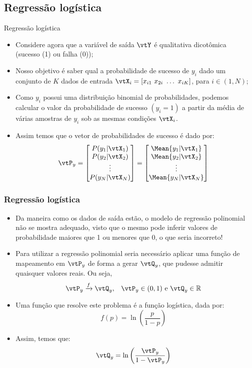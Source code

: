 \subsection{Regressão logística}
\begin{frame}{Regressão logística}
	\begin{itemize}
		\item Considere agora que a variável de saída $\vtY$ é qualitativa dicotômica (sucesso (1) ou falha (0));
		\item Nosso objetivo é saber qual a probabilidade de sucesso de $y_i$ dado um conjunto de $K$ dados de entrada $\vtX_i = [x_{i1} \,\, x_{2i} \,\, \dots \,\, x_{iK}]$, para $i \in (1, N)$;
		\item Como $y_i$ possui uma distribuição binomial de probabilidades, podemos calcular o valor da probabilidade de sucesso $(y_i = 1)$ a partir da média de várias amostras de $y_i$ sob as mesmas condições $\vtX_i$.
		\item Assim temos que o vetor de probabilidades de sucesso é dado por:
		\[
			\vtP_y = \begin{bmatrix}
				P(y_1 | \vtX_1) \\
				P(y_2 | \vtX_2) \\
				\vdots \\
				P(y_N | \vtX_N)
			\end{bmatrix} = 
			\begin{bmatrix}
				\Mean{y_1 | \vtX_1} \\
				\Mean{y_2 | \vtX_2} \\
				\vdots \\
				\Mean{y_N | \vtX_N}
			\end{bmatrix}
		\]
	\end{itemize}
\end{frame}

\begin{frame}
	\frametitle{Regressão logística}
	\begin{itemize}
		\item Da maneira como os dados de saída estão, o modelo de regressão polinomial não se mostra adequado, visto que o mesmo pode inferir valores de probabilidade maiores que 1 ou menores que 0, o que seria incorreto!
		\item Para utilizar a regressão polinomial seria necessário aplicar uma função de mapeamento em $\vtP_y$ de forma a gerar $\vtQ_y$, que pudesse admitir quaisquer valores reais. Ou seja,
		\begin{equation}
			\vtP_y \xrightarrow{f} \vtQ_y, \,\,\,\,\, \vtP_y \in (0,1) \textrm{ e } \vtQ_y \in \mathbb{R}
		\end{equation}
		\item Uma função que resolve este problema é a função logística, dada por:
		\begin{equation}
			f(p) = \ln\left(\dfrac{p}{1-p}\right)
		\end{equation}
		\item Assim, temos que:
		\begin{equation}
			\vtQ_y = \ln\left(\dfrac{\vtP_y}{1 - \vtP_y}\right)
		\end{equation}
	\end{itemize}
\end{frame}

